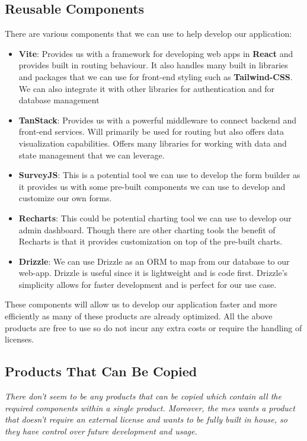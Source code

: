 \documentclass[12pt]{article}
\begin{document}
\subsection{Reusable Components}
There are various components that we can use to help develop our application:
\begin{itemize}
  \item \textbf{Vite}: Provides us with a framework for developing web apps in \textbf{React} and provides built in
    routing behaviour. It also handles many built in libraries and packages that we can use for front-end styling such
    as \textbf{Tailwind-CSS}. We can also integrate it with other libraries for authentication and for database
    management
  \item \textbf{TanStack}: Provides us with a powerful middleware to connect backend and front-end services. Will
    primarily be used for routing but also offers data visualization capabilities. Offers many libraries for working
    with data and state management that we can leverage.
  \item \textbf{SurveyJS}: This is a potential tool we can use to develop the form builder as it provides us with some
    pre-built components we can use to develop and customize our own forms.
  \item \textbf{Recharts}: This could be potential charting tool we can use to develop our admin dashboard. Though there
    are other charting tools the benefit of Recharts is that it provides customization on top of the pre-built charts.
  \item \textbf{Drizzle}: We can use Drizzle as an ORM to map from our database to our web-app. Drizzle is useful since
    it is lightweight and is code first. Drizzle's simplicity allows for faster development and is perfect for our use
    case.
\end{itemize}
These components will allow us to develop our application faster and more efficiently as many of these products are
already optimized. All the above products are free to use so do not incur any extra costs or require the handling of
licenses.
\subsection{Products That Can Be Copied}
\textit{There don't seem to be any products that can be copied which contain all the required components within a single
product. Moreover, the \gls{mes} wants a product that doesn't require an external license and wants to be fully built in
house, so they have control over future development and usage.}
\end{document}

